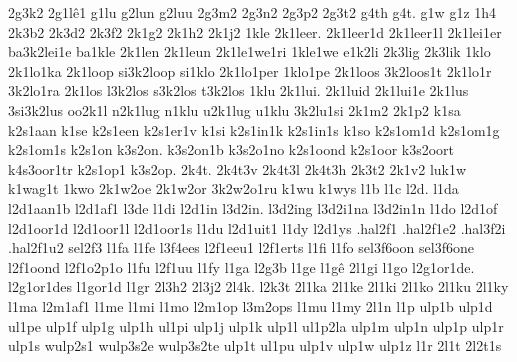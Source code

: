 {2g3k2
2g1lê1
g1lu
g2lun
g2luu
2g3m2
2g3n2
2g3p2
2g3t2
g4th
g4t.
g1w
g1z
%
1h4
%
%
2k3b2
2k3d2
2k3f2
2k1g2
2k1h2
2k1j2
%
1kle
2k1leer.
2k1leer1d
2k1leer1l
2k1lei1er
ba3k2lei1e
ba1kle
2k1len
2k1leun
2k1le1we1ri
1kle1we
e1k2li
2k3lig
2k3lik
1klo
2k1lo1ka
2k1loop
si3k2loop
si1klo
2k1lo1per
1klo1pe
2k1loos
3k2loos1t
2k1lo1r
3k2lo1ra
2k1los
l3k2los
s3k2los
t3k2los
1klu
2k1lui.
2k1luid
2k1lui1e
2k1lus
3si3k2lus
oo2k1l
n2k1lug
n1klu
u2k1lug
u1klu
3k2lu1si
%
2k1m2
2k1p2
k1sa
k2s1aan
k1se
k2s1een
k2s1er1v
k1si
k2s1in1k
k2s1in1s
k1so
k2s1om1d
k2s1om1g
k2s1om1s
k2s1on
k3s2on.
k3s2on1b
k3s2o1no
k2s1oond
k2s1oor
k3s2oort
k4s3oor1tr
k2s1op1
k3s2op.
2k4t.
2k4t3v
2k4t3l
2k4t3h
2k3t2
2k1v2
%
luk1w
k1wag1t
1kwo
2k1w2oe
2k1w2or
3k2w2o1ru
k1wu
k1wys
%
%
l1b
l1c
l2d.
l1da
l2d1aan1b
l2d1af1
l3de
l1di
l2d1in
l3d2in.
l3d2ing
l3d2i1na
l3d2in1n
l1do
l2d1of
l2d1oor1d
l2d1oor1l
l2d1oor1s
l1du
l2d1uit1
l1dy
l2d1ys
.hal2f1
.hal2f1e2
.hal3f2i
.hal2f1u2
sel2f3
%
l1fa
l1fe
l3f4ees
l2f1eeu1
l2f1erts
l1fi
l1fo
sel3f6oon
sel3f6one
l2f1oond
l2f1o2p1o
l1fu
l2f1uu
l1fy
%
l1ga
l2g3b
l1ge
l1gê
2l1gi
l1go
l2g1or1de.
l2g1or1des
l1gor1d
l1gr
2l3h2
2l3j2
2l4k.
l2k3t
2l1ka
2l1ke
2l1ki
2l1ko
2l1ku
2l1ky
l1ma
l2m1af1
l1me
l1mi
l1mo
l2m1op
l3m2ops
l1mu
l1my
2l1n
%
l1p
ulp1b
ulp1d
ul1pe
ulp1f
ulp1g
ulp1h
ul1pi
ulp1j
ulp1k
ulp1l
ul1p2la
ulp1m
ulp1n
ulp1p
ulp1r
ulp1s
wulp2s1
wulp3s2e
wulp3s2te
ulp1t
ul1pu
ulp1v
ulp1w
ulp1z
%
l1r
2l1t
2l2t1s
}
